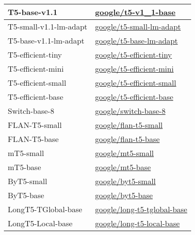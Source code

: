 \begin{longtable}{| l | l |}
    \hline
    T5-base-v1.1 & \href{https://huggingface.co/google/t5-v1_1-base}{google/t5-v1\_1-base} \\
    \hline
    T5-small-v1.1-lm-adapt & \href{https://huggingface.co/google/t5-small-lm-adapt}{google/t5-small-lm-adapt} \\
    \hline
    T5-base-v1.1-lm-adapt & \href{https://huggingface.co/google/t5-base-lm-adapt}{google/t5-base-lm-adapt} \\
    \hline
    T5-efficient-tiny & \href{https://huggingface.co/google/t5-efficient-tiny}{google/t5-efficient-tiny} \\
    \hline
    T5-efficient-mini & \href{https://huggingface.co/google/t5-efficient-mini}{google/t5-efficient-mini} \\
    \hline
    T5-efficient-small & \href{https://huggingface.co/google/t5-efficient-small}{google/t5-efficient-small} \\
    \hline
    T5-efficient-base & \href{https://huggingface.co/google/t5-efficient-base}{google/t5-efficient-base} \\
    \hline
    Switch-base-8 & \href{https://huggingface.co/google/switch-base-8}{google/switch-base-8} \\
    \hline
    FLAN-T5-small & \href{https://huggingface.co/google/flan-t5-small}{google/flan-t5-small} \\
    \hline
    FLAN-T5-base & \href{https://huggingface.co/google/flan-t5-base}{google/flan-t5-base} \\
    \hline
    mT5-small & \href{https://huggingface.co/google/mt5-small}{google/mt5-small} \\
    \hline
    mT5-base & \href{https://huggingface.co/google/mt5-base}{google/mt5-base} \\
    \hline
    ByT5-small & \href{https://huggingface.co/google/byt5-small}{google/byt5-small} \\
    \hline
    ByT5-base & \href{https://huggingface.co/google/byt5-base}{google/byt5-base} \\
    \hline
    LongT5-TGlobal-base & \href{https://huggingface.co/google/long-t5-tglobal-base}{google/long-t5-tglobal-base} \\
    \hline
    LongT5-Local-base & \href{https://huggingface.co/google/long-t5-local-base}{google/long-t5-local-base} \\
    \hline
\end{longtable}

